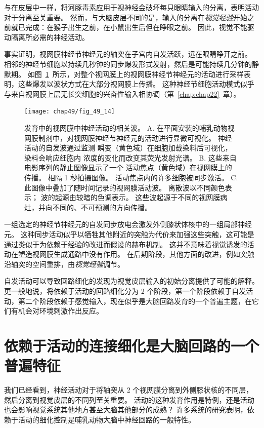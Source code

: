 与在皮层中一样，将河豚毒素应用于视神经会破坏每只眼睛输入的分离，表明活动对于分离至关重要。
然而，与大脑皮层不同的是，输入的分离在\textit{视觉经验}开始之前就已完成：在猴子出生之前，在小鼠出生后但在睁眼之前。
因此，视觉不能驱动隔离所必需的神经活动。


事实证明，视网膜神经节神经元的轴突在子宫内自发活跃，远在眼睛睁开之前。
相邻的神经节细胞以持续几秒钟的同步爆发形式发射，然后是可能持续几分钟的静默期。
如图~\ref{fig:49_14}~所示，对整个视网膜上的视网膜神经节神经元的活动进行采样表明，这些爆发以波状方式在大部分视网膜上传播。
这种神经节细胞活动模式似乎与来自视网膜上层无长突细胞的兴奋性输入相协调（第~\ref{chap:chap22}~章）。


\begin{figure}[htbp]
	\centering
	\texttt{[image: chap49/fig\_49\_14]}
	\caption{发育中的视网膜中神经活动的相关波。
		A. 在平面安装的哺乳动物视网膜制剂中，对视网膜神经节神经元的活动进行显微可视化。
		神经活动的自发波通过监测  瞬变（黄色域）在细胞加载染料后可视化，染料会响应细胞内  浓度的变化而改变其荧光发射光谱。
		B. 这些来自电影序列的静止图像显示了一个  活动焦点（黄色域）在视网膜上的传播。
		相隔 1 秒拍摄图像。
		活动焦点内的许多细胞被同步激活。
		C. 此图像中叠加了随时间记录的视网膜活动波。
		离散波以不同颜色表示；
		波的起源由较暗的色调表示。
		这些波起源于不同的视网膜病灶，并向不同的、不可预测的方向传播。}
	\label{fig:49_14}
\end{figure}


一组选定的神经节神经元的自发同步放电会激发外侧膝状体核中的一组局部神经元。
这种同步活动似乎以牺牲其他附近的突触为代价来加强这些突触，这可能是通过类似于为依赖于经验的改进而假设的赫布机制。
这并不意味着视觉诱发的活动在塑造视网膜生成通路中没有作用。
在后期阶段，其他方面的改进，例如突触沿轴突的空间重排，由\textit{视觉经验}调节。


自发活动可以导致回路细化的发现为视觉皮层输入的初始分离提供了可能的解释。
更一般地说，将依赖于活动的回路细化分为 2 个阶段，第一个阶段依赖于自发活动，第二个阶段依赖于感觉输入，现在似乎是大脑回路发育的一个普遍主题，在它们有机会对环境刺激作出反应。



\section{依赖于活动的连接细化是大脑回路的一个普遍特征}

我们已经看到，神经活动对于将轴突从 2 个视网膜分离到外侧膝状核的不同层，然后分离到视觉皮层的不同列至关重要。
活动的这种发育作用是特例，还是活动也会影响视觉系统其他地方甚至大脑其他部分的成熟？
许多系统的研究表明，依赖于活动的细化控制是哺乳动物大脑中神经回路的一般特性。



